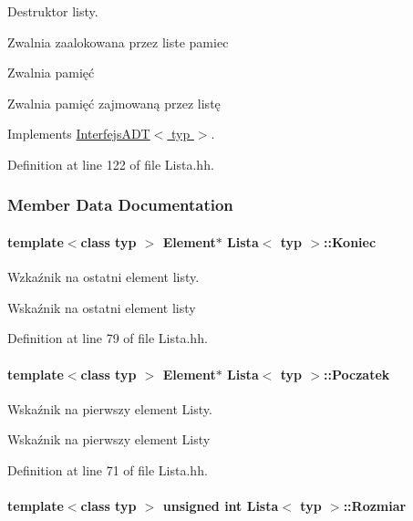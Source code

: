 Destruktor listy. 

Zwalnia zaalokowana przez liste pamiec

Zwalnia pamięć

Zwalnia pamięć zajmowaną przez listę 

Implements \hyperlink{class_interfejs_a_d_t_a75427479b00e3d4a0c5f9615216262ea}{Interfejs\-A\-D\-T$<$ typ $>$}.



Definition at line 122 of file Lista.\-hh.



\subsubsection{Member Data Documentation}
\hypertarget{class_lista_a5c0ab4649945504ec400bb028f95ae1a}{
\paragraph[{Koniec}]{\setlength{\rightskip}{0pt plus 5cm}template$<$class typ $>$ {\bf Element}$\ast$ {\bf Lista}$<$ typ $>$\-::Koniec\hspace{0.3cm}{\ttfamily [private]}}}\label{class_lista_a5c0ab4649945504ec400bb028f95ae1a}


Wzkaźnik na ostatni element listy. 

Wskaźnik na ostatni element listy 

Definition at line 79 of file Lista.\-hh.

\hypertarget{class_lista_af0b9911cad81701e55a4290a3941fa29}{
\paragraph[{Poczatek}]{\setlength{\rightskip}{0pt plus 5cm}template$<$class typ $>$ {\bf Element}$\ast$ {\bf Lista}$<$ typ $>$\-::Poczatek\hspace{0.3cm}{\ttfamily [private]}}}\label{class_lista_af0b9911cad81701e55a4290a3941fa29}


Wskaźnik na pierwszy element Listy. 

Wskaźnik na pierwszy element Listy 

Definition at line 71 of file Lista.\-hh.

\hypertarget{class_lista_a3bc5134ce062dfd20cc7747d34f3ff16}{
\paragraph[{Rozmiar}]{\setlength{\rightskip}{0pt plus 5cm}template$<$class typ $>$ unsigned int {\bf Lista}$<$ typ $>$\-::Rozmiar\hspace{0.3cm}{\ttfamily [private]}}}\label{class_lista_a3bc5134ce062dfd20cc7747d34f3ff16}


